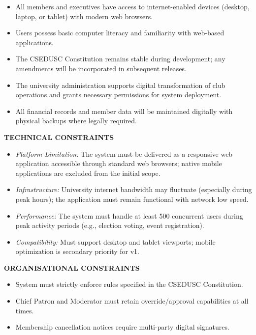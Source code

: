 \documentclass[12pt,a4paper]{article}
\begin{document}
\begin{itemize}[noitemsep]
  \item All members and executives have access to internet-enabled devices (desktop, laptop, or tablet) with modern web browsers.
  \item Users possess basic computer literacy and familiarity with web-based applications.
  \item The CSEDUSC Constitution remains stable during development; any amendments will be incorporated in subsequent releases.
  \item The university administration supports digital transformation of club operations and grants necessary permissions for system deployment.
  \item All financial records and member data will be maintained digitally with physical backups where legally required.
\end{itemize}

\textbf{\small\color{Teal}TECHNICAL CONSTRAINTS}\vspace{4pt}

\begin{itemize}[noitemsep]
  \item \textit{Platform Limitation:} The system must be delivered as a responsive web application accessible through standard web browsers; native mobile applications are excluded from the initial scope.
  \item \textit{Infrastructure:} University internet bandwidth may fluctuate (especially during peak hours); the application must remain functional with network low speed.
  \item \textit{Performance:} The system must handle at least 500 concurrent users during peak activity periods (e.g., election voting, event registration).
  \item \textit{Compatibility:} Must support desktop and tablet viewports; mobile optimization is secondary priority for v1.
\end{itemize}

\textbf{\small\color{Teal}ORGANISATIONAL CONSTRAINTS}\vspace{4pt}

\begin{itemize}[noitemsep]
  \item System must strictly enforce rules specified in the CSEDUSC Constitution.
  \item Chief Patron and Moderator must retain override/approval capabilities at all times.
  \item Membership cancellation notices require multi-party digital signatures.
\end{itemize}
\end{document}
